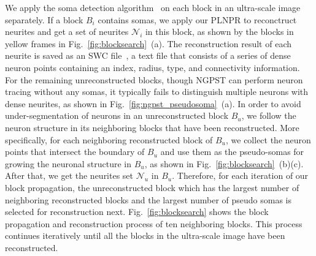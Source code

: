  
We apply the soma detection algorithm~\cite{Quan2013} on each block in an ultra-scale image separately. 
If a block $B_{i}$ contains somas, we apply our PLNPR to reconctruct neurites and get a set of neurites $\mathcal{N}_{i}$ in this block, as shown by the blocks in yellow frames in Fig.~\ref{fig:blocksearch}~(a).
The reconstruction result of each neurite is saved as an SWC file~\cite{Cannon1998}, a text file that consists of a series of dense neuron points containing an index, radius, type, and connectivity information.
%
For the remaining unreconstructed blocks, though NGPST can perform neuron tracing without any somas, it typically fails to distinguish multiple neurons with dense neurites, as shown in Fig.~\ref{fig:ngpst_pseudosoma}~(a).
%
In order to avoid under-segmentation of neurons in an unreconstructed block $B_u$, we follow the neuron structure in its neighboring blocks that have been reconstructed.
%
More specifically, for each neighboring reconstructed block of $B_u$, we collect the neuron points that intersect the boundary of $B_u$ and use them as the pseudo-somas for growing the neuronal structure in $B_u$, as shown in Fig.~\ref{fig:blocksearch}~(b)(c). After that, we get the neurites set $ \mathcal{N}_u$ in $B_u$.
%
Therefore, for each iteration of our block propagation, the unreconstructed block which has the largest number of neighboring reconstructed blocks and the largest number of pseudo somas is selected for reconstruction next.
%
Fig.~\ref{fig:blocksearch} shows the block propagation and reconstruction process of ten neighboring blocks. 
%
This process continues iteratively until all the blocks in the ultra-scale image have been reconstructed. 
%

